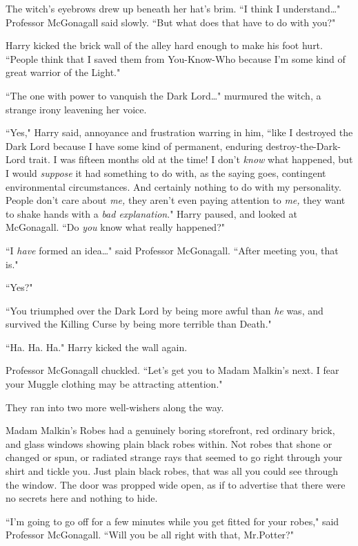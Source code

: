 The witch's eyebrows drew up beneath her hat's brim. ``I think I understand{\ldots}" Professor McGonagall said slowly. ``But what does that have to do with you?"

Harry kicked the brick wall of the alley hard enough to make his foot hurt. ``People think that I saved them from You-Know-Who because I'm some kind of great warrior of the Light."

``The one with power to vanquish the Dark Lord{\ldots}" murmured the witch, a strange irony leavening her voice.

``Yes," Harry said, annoyance and frustration warring in him, ``like I destroyed the Dark Lord because I have some kind of permanent, enduring destroy-the-Dark-Lord trait. I was fifteen months old at the time! I don't \emph{know} what happened, but I would \emph{suppose} it had something to do with, as the saying goes, contingent environmental circumstances. And certainly nothing to do with my personality. People don't care about \emph{me,} they aren't even paying attention to \emph{me,} they want to shake hands with a \emph{bad explanation}." Harry paused, and looked at McGonagall. ``Do \emph{you} know what really happened?"

``I \emph{have} formed an idea{\ldots}" said Professor McGonagall. ``After meeting you, that is."

``Yes?"

``You triumphed over the Dark Lord by being more awful than \emph{he} was, and survived the Killing Curse by being more terrible than Death."

``Ha. Ha. Ha." Harry kicked the wall again.

Professor McGonagall chuckled. ``Let's get you to Madam Malkin's next. I fear your Muggle clothing may be attracting attention."

They ran into two more well-wishers along the way.

Madam Malkin's Robes had a genuinely boring storefront, red ordinary brick, and glass windows showing plain black robes within. Not robes that shone or changed or spun, or radiated strange rays that seemed to go right through your shirt and tickle you. Just plain black robes, that was all you could see through the window. The door was propped wide open, as if to advertise that there were no secrets here and nothing to hide.

``I'm going to go off for a few minutes while you get fitted for your robes," said Professor McGonagall. ``Will you be all right with that, Mr.\?Potter?"

